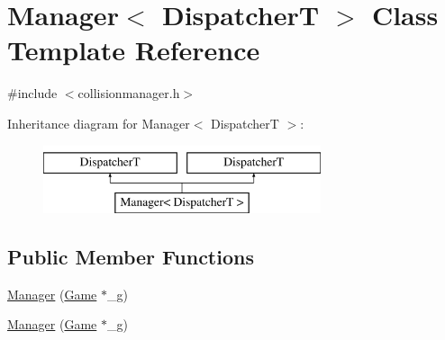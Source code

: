 \hypertarget{class_manager}{\section{Manager$<$ Dispatcher\-T $>$ Class Template Reference}
\label{class_manager}
}


{\ttfamily \#include $<$collisionmanager.\-h$>$}

Inheritance diagram for Manager$<$ Dispatcher\-T $>$\-:\begin{figure}[H]
\begin{center}
\leavevmode
\includegraphics[height=2.000000cm]{class_manager}
\end{center}
\end{figure}
\subsection*{Public Member Functions}
\begin{DoxyCompactItemize}
\item 
\hyperlink{class_manager_acf4518aae98aa841e94511ad59d105a4}{Manager} (\hyperlink{class_game}{Game} $\ast$\-\_\-g)
\item 
\hyperlink{class_manager_acf4518aae98aa841e94511ad59d105a4}{Manager} (\hyperlink{class_game}{Game} $\ast$\-\_\-g)
\end{DoxyCompactItemize}


